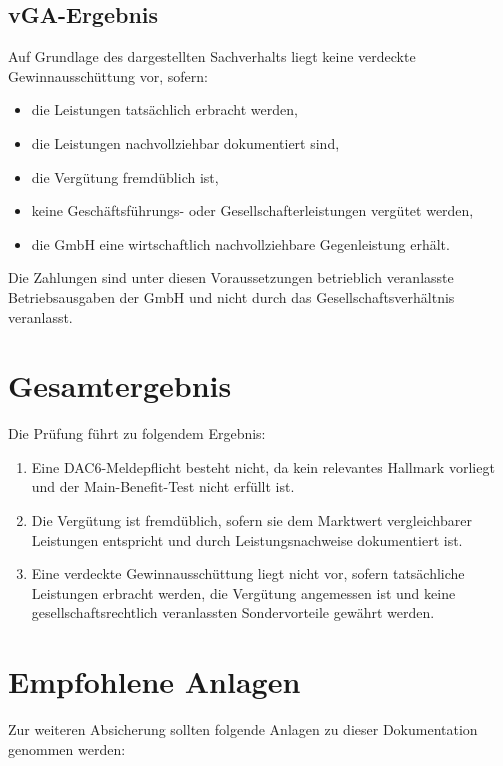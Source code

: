 \documentclass[11pt,a4paper]{article}
\begin{document}
\subsection{vGA-Ergebnis}

Auf Grundlage des dargestellten Sachverhalts liegt keine verdeckte Gewinnausschüttung vor, sofern:

\begin{itemize}
    \item die Leistungen tatsächlich erbracht werden,
    \item die Leistungen nachvollziehbar dokumentiert sind,
    \item die Vergütung fremdüblich ist,
    \item keine Geschäftsführungs- oder Gesellschafterleistungen vergütet werden,
    \item die GmbH eine wirtschaftlich nachvollziehbare Gegenleistung erhält.
\end{itemize}

Die Zahlungen sind unter diesen Voraussetzungen betrieblich veranlasste Betriebsausgaben der GmbH und nicht durch das Gesellschaftsverhältnis veranlasst.

\section{Gesamtergebnis}

Die Prüfung führt zu folgendem Ergebnis:

\begin{enumerate}
    \item Eine DAC6-Meldepflicht besteht nicht, da kein relevantes Hallmark vorliegt und der Main-Benefit-Test nicht erfüllt ist.
    \item Die Vergütung ist fremdüblich, sofern sie dem Marktwert vergleichbarer Leistungen entspricht und durch Leistungsnachweise dokumentiert ist.
    \item Eine verdeckte Gewinnausschüttung liegt nicht vor, sofern tatsächliche Leistungen erbracht werden, die Vergütung angemessen ist und keine gesellschaftsrechtlich veranlassten Sondervorteile gewährt werden.
\end{enumerate}

\section{Empfohlene Anlagen}

Zur weiteren Absicherung sollten folgende Anlagen zu dieser Dokumentation genommen werden:
\end{document}
